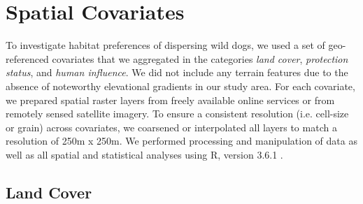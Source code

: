 \documentclass[abstract=off,10pt,a4paper,bibliography=totocnumbered]{article}
\begin{document}
\newpage
\section{Spatial Covariates}
To investigate habitat preferences of dispersing wild dogs, we used a set of
geo-referenced covariates that we aggregated in the categories \textit{land
cover}, \textit{protection status}, and \textit{human influence}. We did not
include any terrain features due to the absence of noteworthy elevational
gradients in our study area. For each covariate, we prepared spatial raster
layers from freely available online services or from remotely sensed satellite
imagery. To ensure a consistent resolution (i.e. cell-size or grain) across
covariates, we coarsened or interpolated all layers to match a resolution of
250m x 250m. We performed processing and manipulation of data as well as all
spatial and statistical analyses using R, version 3.6.1 \citep{R.2019}.

\subsection{Land Cover}
\end{document}
